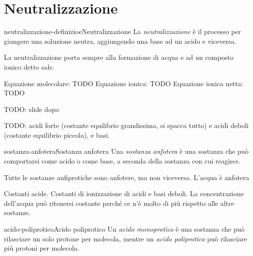 \documentclass[preview]{standalone}
\begin{document}
\section{Neutralizzazione}

\begin{snippetdefinition}{neutralizzazione-definizioe}{Neutralizzazione}
    La \textit{neutralizzazione} è il processo per giungere una soluzione
    neutra, aggiungendo una base ad un acido e viceversa.
\end{snippetdefinition}

\begin{plainhtml}
    La neutralizzazione porta sempre alla formazione di acqua
    e ad un composto ionico detto sale.
\end{plainhtml}

Equazione molecolare: TODO
Equazione ionica: TODO
Equazione ionica netta: TODO

TODO: slide dopo

TODO: acidi forte (costante equilibrio grandissima, si spacca tutto)
e acidi deboli (costante equilibrio piccola), e basi.

%
%
%
%
%
%

\begin{snippetdefinition}{sostanza-anfotera}{Sostanza anfotera}
    Una \textit{sostanza anfotera} è una sostanza che
    può comportarsi come acido o come base, a seconda della sostanza con cui reagisce.
\end{snippetdefinition}

\begin{plainhtml}
    Tutte le sostanze anfiprotiche sono anfotere, ma non viceversa.
    L'acqua è anfotera
\end{plainhtml}

\begin{plainhtml}
    Costanti acide. Costanti di ionizzazione di acidi e basi deboli.
    La concentrazione dell'acqua può ritenersi costante perché ce n'è molto di più rispetto alle altre sostanze.
\end{plainhtml}

\begin{snippetdefinition}{acido-poliprotico}{Acido poliprotico}
    Un \textit{acido monoprotico} è una sostanza che può rilasciare
    un solo protone per molecola, mentre un \textit{acido poliprotico}
    può rilasciare più protoni per molecola.
\end{snippetdefinition}
\end{document}
